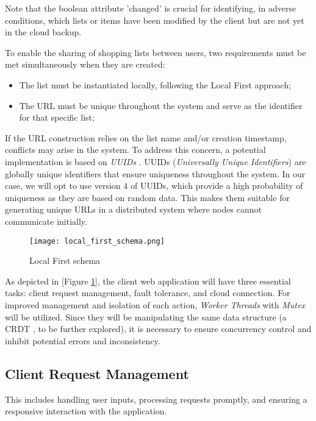 \documentclass[sigconf, authorversion, nonacm]{acmart}
\begin{document}
Note that the boolean attribute 'changed' is crucial for identifying, in adverse conditions, which lists or items have been modified by the client but are not yet in the cloud backup. 

To enable the sharing of shopping lists between users, two requirements must be met simultaneously when they are created:

\begin{itemize}
    \item The list must be instantiated locally, following the Local First approach;
    \item The URL must be unique throughout the system and serve as the identifier for that specific list;
\end{itemize}

If the URL construction relies on the list name and/or creation timestamp, conflicts may arise in the system. To address this concern, a potential implementation is based on \textit{UUIDs} \cite{zeromq}. UUIDs (\textit{Universally Unique Identifiers}) are globally unique identifiers that ensure uniqueness throughout the system. In our case, we will opt to use version 4 of UUIDs, which provide a high probability of uniqueness as they are based on random data. This makes them suitable for generating unique URLs in a distributed system where nodes cannot communicate initially.

\begin{figure}[H]
    \centering
    \texttt{[image: local\_first\_schema.png]}
    \caption{Local First schema}
    \label{fig:Local First Schema}
\end{figure}

As depicted in [Figure \ref{fig:Local First Schema}], the client web application will have three essential tasks: client request management, fault tolerance, and cloud connection. For improved management and isolation of each action, \textit{Worker Threads} with \textit{Mutex} will be utilized. Since they will be manipulating the same data structure (a CRDT \cite{crdt}, to be further explored), it is necessary to ensure concurrency control and inhibit potential errors and inconsistency.

\subsection{Client Request Management}

This includes handling user inputs, processing requests promptly, and ensuring a responsive interaction with the application.
\end{document}
